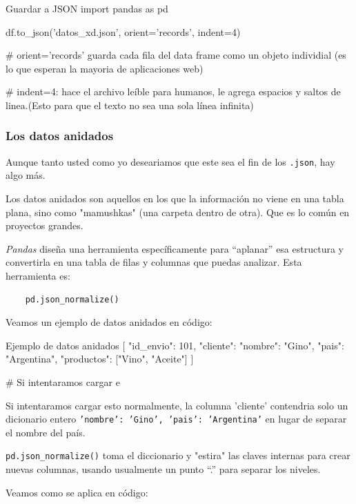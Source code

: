 \begin{pycode}{Guardar a JSON}
import pandas as pd

df.to_json('datos_xd.json', orient='records', indent=4)

# orient='records' guarda cada fila del data frame como un objeto individial (es lo que esperan la mayoria de aplicaciones web)

# indent=4: hace el archivo leíble para humanos, le agrega espacios y saltos de linea.(Esto para que el texto no sea una sola línea infinita)

\end{pycode}



\subsubsection{Los datos anidados}

Aunque tanto usted como yo deseariamos que este sea el fin de los \texttt{.json}, hay algo más.

Los datos anidados son aquellos en los que la información no viene en una tabla plana, sino como "mamushkas" (una carpeta dentro de otra). Que es lo común en proyectos grandes.

\textit{Pandas} diseña una herramienta específicamente para ``aplanar'' esa estructura y convertirla en una tabla de filas y columnas que puedas analizar. Esta herramienta es:
\begin{verbatim}
    pd.json_normalize()
\end{verbatim}

Veamos un ejemplo de datos anidados en código:
\begin{pycode}{Ejemplo de datos anidados}
[
    {
        "id_envio": 101,
        "cliente": {"nombre": "Gino", "pais": "Argentina"},
        "productos": ["Vino", "Aceite"]
    }
]

# Si intentaramos cargar e

\end{pycode}

Si intentaramos cargar esto normalmente, la columna 'cliente' contendria solo un dicionario entero \texttt{{'nombre': 'Gino', 'pais': 'Argentina'}} en lugar de separar el nombre del país.

\texttt{pd.json\_normalize()} toma el diccionario y "estira" las claves internas para crear nuevas columnas, usando usualmente un punto ``.'' para separar los niveles.

Veamos como se aplica en código:

